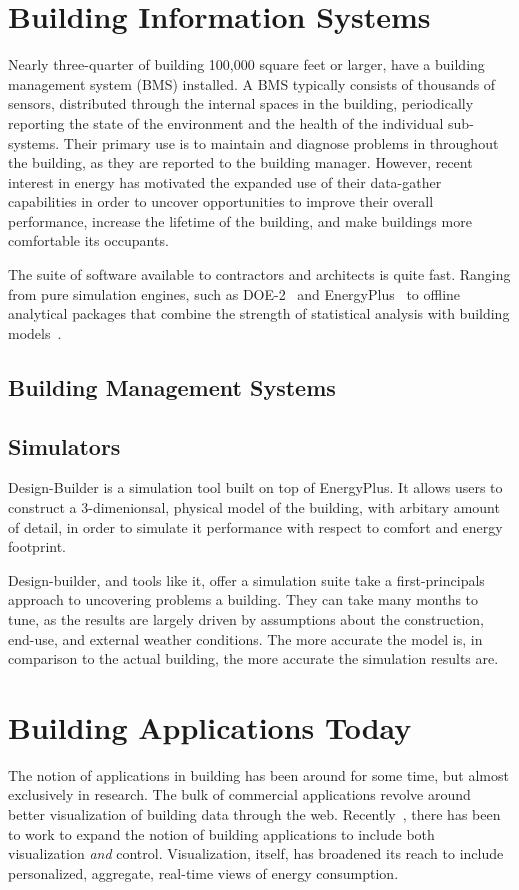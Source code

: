 \section{Building Information Systems}
Nearly three-quarter of building 100,000 square feet or larger, have a building management system (BMS) installed.  
A BMS typically consists of thousands of sensors, distributed through the internal spaces in the building, periodically reporting 
the state of the environment and the health of the individual sub-systems.  Their primary use is to maintain and diagnose problems
in throughout the building, as they are reported to the building manager.  However, recent interest in energy has motivated the 
expanded use of their data-gather capabilities in order to uncover opportunities to improve their overall performance, increase the
lifetime of the building, and make buildings more comfortable its occupants.

The suite of software available to contractors and architects is quite fast.  Ranging from pure simulation engines, such as 
DOE-2~\cite{doe_2} and EnergyPlus~\cite{eplus} to offline analytical packages that combine the strength of statistical analysis
with building models~\cite{osisoft}.

\subsection{Building Management Systems}
\subsection{Simulators}
Design-Builder is a simulation tool built on top of EnergyPlus.  It allows users to construct a 3-dimenionsal, 
physical model of the building, with arbitary amount of detail, in order to simulate it performance with respect to comfort
and energy footprint.

Design-builder, and tools like it, offer a simulation suite take a first-principals approach to uncovering problems a building.
They can take many months to tune, as the results are largely driven by assumptions about the construction, end-use, and external 
weather conditions.  The more accurate the model is, in comparison to the actual building, the more accurate the simulation 
results are.


\section{Building Applications Today}
The notion of applications in building has been around for some time, but almost exclusively in research.  The bulk of commercial
applications revolve around better visualization of building data through the web.  Recently~\cite{andrew_lighting, buildsys1, buildsys2},
there has been to work to expand the notion of building applications to include both visualization \emph{and} control.  Visualization, itself,
has broadened its reach to include personalized, aggregate, real-time views of energy consumption.

